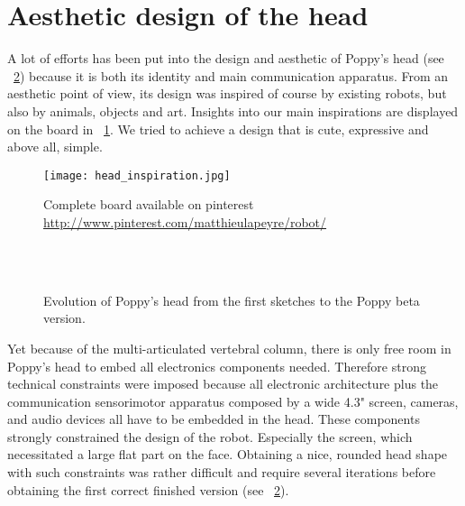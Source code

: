 
\section{Aesthetic design of the head } %
\label{sec:head-design}
A lot of efforts has been put into the design and aesthetic of Poppy's head (see \figurename~\ref{fig:poppy_head_beta}) because it is both its identity and main communication apparatus.
From an aesthetic point of view, its design was inspired of course by existing robots, but also by animals, objects and art. Insights into our  main inspirations are displayed on the board in \figurename~\ref{fig:head_inspiration}. We tried to achieve a design that is cute, expressive and above all, simple.

\begin{figure}[p]
    \begin{center}
        \texttt{[image: head\_inspiration.jpg]}
    \end{center}
    \caption{Complete board available on pinterest \url{http://www.pinterest.com/matthieulapeyre/robot/}}
    \label{fig:head_inspiration}
\end{figure}

\begin{figure}[p]
\centering
    \hfill
    \\
    \hfill
    \\
    \hfill
    \caption{Evolution of Poppy’s head from the first sketches to the Poppy beta version.}
    \label{fig:poppy_head_beta}
\end{figure}

Yet because of the multi-articulated vertebral column, there is only free room in Poppy’s head to embed all electronics components needed. Therefore strong technical constraints were imposed because all electronic architecture plus the communication sensorimotor apparatus composed by a wide 4.3" screen, cameras, and audio devices all have to be embedded in the head.
These components strongly constrained the design of the robot. Especially the screen, which necessitated a large flat part on the face. Obtaining a nice, rounded head shape with such constraints was rather difficult and require several iterations before obtaining the first correct finished version (see \figurename~\ref{fig:poppy_head_beta}).

